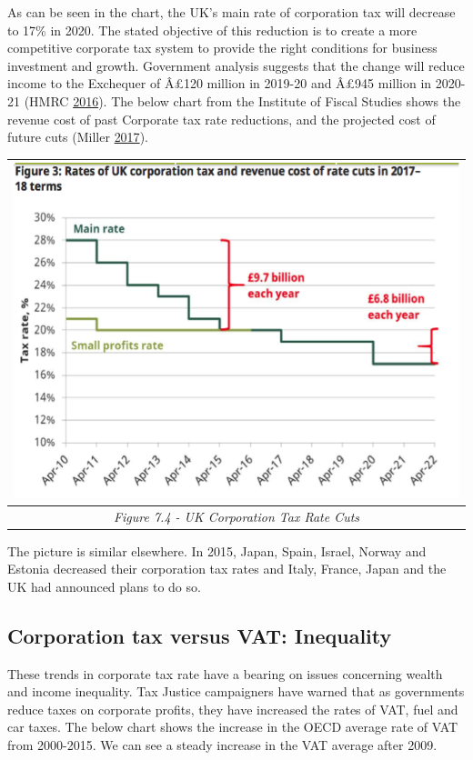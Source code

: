 \documentclass[]{tufte-handout}
\begin{document}
As can be seen in the chart, the UK's main rate of corporation tax will
decrease to 17\% in 2020. The stated objective of this reduction is to
create a more competitive corporate tax system to provide the right
conditions for business investment and growth. Government analysis
suggests that the change will reduce income to the Exchequer of Â£120
million in 2019-20 and Â£945 million in 2020-21 (HMRC
\protect\hyperlink{ref-HMRC2015}{2016}). The below chart from the
Institute of Fiscal Studies shows the revenue cost of past Corporate tax
rate reductions, and the projected cost of future cuts (Miller
\protect\hyperlink{ref-Miller2017}{2017}).

\begin{longtable}[]{@{}c@{}}
\toprule
\includegraphics{ChapterPictures/7-4-UKCorpTaxCuts.png}\tabularnewline
\midrule
\endhead
\emph{Figure 7.4 - UK Corporation Tax Rate Cuts}\tabularnewline
\bottomrule
\end{longtable}

The picture is similar elsewhere. In 2015, Japan, Spain, Israel, Norway
and Estonia decreased their corporation tax rates and Italy, France,
Japan and the UK had announced plans to do so.

\hypertarget{corporation-tax-versus-vat-inequality}{%
\subsection{Corporation tax versus VAT:
Inequality}\label{corporation-tax-versus-vat-inequality}}

These trends in corporate tax rate have a bearing on issues concerning
wealth and income inequality. Tax Justice campaigners have warned that
as governments reduce taxes on corporate profits, they have increased
the rates of VAT, fuel and car taxes. The below chart shows the increase
in the OECD average rate of VAT from 2000-2015. We can see a steady
increase in the VAT average after 2009.
\end{document}
